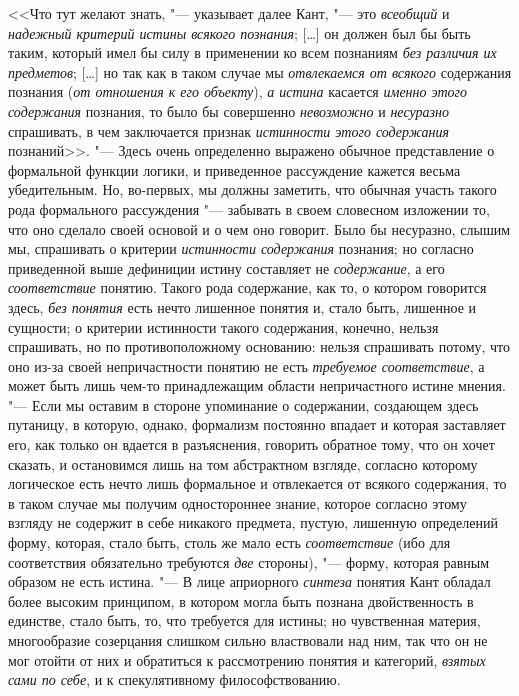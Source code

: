 <<Что тут желают знать, "--- указывает далее Кант,
"--- это {\em всеобщий} и {\em надежный критерий
истины всякого познания}; [\ldots] он должен был бы быть таким,
который имел бы силу в применении ко всем познаниям
{\em без различия их предметов}; [\ldots] но так как в таком случае мы
{\em отвлекаемся от всякого} содержания познания
({\em от отношения к его объекту}), {\em а истина} касается
{\em именно этого содержания} познания, то было бы совершенно
{\em невозможно} и {\em несуразно} спрашивать, в чем заключается признак
{\em истинности этого содержания} познаний>>.
"--- Здесь очень определенно выражено обычное представление о
формальной функции логики, и приведенное рассуждение кажется весьма
убедительным. Но, во-первых, мы должны заметить, что обычная участь такого
рода формального рассуждения "--- забывать в своем словесном
изложении то, что оно сделало своей основой и о чем оно говорит. Было бы
несуразно, слышим мы, спрашивать о критерии {\em истинности содержания}
познания; но согласно приведенной выше дефиниции истину
составляет не {\em содержание}, а его {\em соответствие}
понятию. Такого рода содержание, как то, о котором говорится
здесь, {\em без понятия} есть нечто лишенное понятия и, стало быть,
лишенное и сущности; о критерии истинности такого содержания, конечно,
нельзя спрашивать, но по противоположному основанию: нельзя спрашивать
потому, что оно из-за своей непричастности понятию не есть
{\em требуемое соответствие},
а может быть лишь чем-то принадлежащим области непричастного
истине мнения. "--- Если мы оставим в стороне упоминание о
содержании, создающем здесь путаницу, в которую, однако, формализм
постоянно впадает и которая заставляет его, как только он вдается в
разъяснения, говорить обратное тому, что он хочет сказать, и остановимся
лишь на том абстрактном взгляде, согласно которому логическое есть нечто
лишь формальное и отвлекается от всякого содержания, то в таком случае мы
получим одностороннее знание, которое согласно этому взгляду не содержит в
себе никакого предмета, пустую, лишенную определений форму, которая, стало
быть, столь же мало есть {\em соответствие} (ибо
для соответствия обязательно требуются {\em две} стороны), "---
форму, которая равным образом не есть истина. "---
В лице априорного {\em синтеза} понятия
Кант обладал более высоким принципом, в котором могла быть познана
двойственность в единстве, стало быть, то, что требуется для истины; но
чувственная материя, многообразие созерцания слишком сильно властвовали над
ним, так что он не мог отойти от них и обратиться к рассмотрению понятия и
категорий, {\em взятых сами по себе}, и к спекулятивному философствованию.

